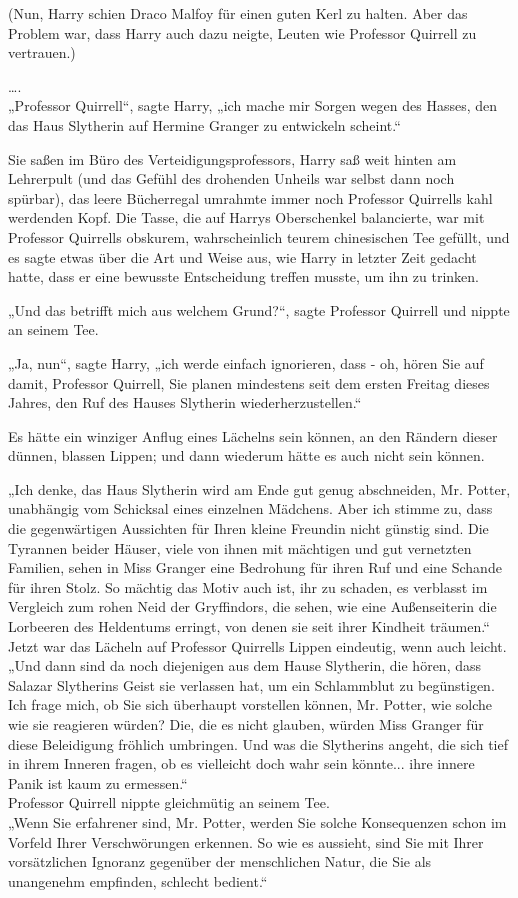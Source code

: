 {(Nun, Harry schien Draco Malfoy für einen guten Kerl zu halten. Aber das Problem war, dass Harry auch dazu neigte, Leuten wie Professor Quirrell zu vertrauen.)

….\\ „Professor Quirrell“, sagte Harry, „ich mache mir Sorgen wegen des Hasses, den das Haus Slytherin auf Hermine Granger zu entwickeln scheint.“

Sie saßen im Büro des Verteidigungsprofessors, Harry saß weit hinten am Lehrerpult (und das Gefühl des drohenden Unheils war selbst dann noch spürbar), das leere Bücherregal umrahmte immer noch Professor Quirrells kahl werdenden Kopf. Die Tasse, die auf Harrys Oberschenkel balancierte, war mit Professor Quirrells obskurem, wahrscheinlich teurem chinesischen Tee gefüllt, und es sagte etwas über die Art und Weise aus, wie Harry in letzter Zeit gedacht hatte, dass er eine bewusste Entscheidung treffen musste, um ihn zu trinken.

„Und das betrifft mich aus welchem Grund?“, sagte Professor Quirrell und nippte an seinem Tee.

„Ja, nun“, sagte Harry, „ich werde einfach ignorieren, dass - oh, hören Sie auf damit, Professor Quirrell, Sie planen mindestens seit dem ersten Freitag dieses Jahres, den Ruf des Hauses Slytherin wiederherzustellen.“

Es hätte ein winziger Anflug eines Lächelns sein können, an den Rändern dieser dünnen, blassen Lippen; und dann wiederum hätte es auch nicht sein können.

„Ich denke, das Haus Slytherin wird am Ende gut genug abschneiden, Mr. Potter, unabhängig vom Schicksal eines einzelnen Mädchens. Aber ich stimme zu, dass die gegenwärtigen Aussichten für Ihren kleine Freundin nicht günstig sind. Die Tyrannen beider Häuser, viele von ihnen mit mächtigen und gut vernetzten Familien, sehen in Miss Granger eine Bedrohung für ihren Ruf und eine Schande für ihren Stolz. So mächtig das Motiv auch ist, ihr zu schaden, es verblasst im Vergleich zum rohen Neid der Gryffindors, die sehen, wie eine Außenseiterin die Lorbeeren des Heldentums erringt, von denen sie seit ihrer Kindheit träumen.“\\ Jetzt war das Lächeln auf Professor Quirrells Lippen eindeutig, wenn auch leicht. „Und dann sind da noch diejenigen aus dem Hause Slytherin, die hören, dass Salazar Slytherins Geist sie verlassen hat, um ein Schlammblut zu begünstigen. Ich frage mich, ob Sie sich überhaupt vorstellen können, Mr. Potter, wie solche wie sie reagieren würden? Die, die es nicht glauben, würden Miss Granger für diese Beleidigung fröhlich umbringen. Und was die Slytherins angeht, die sich tief in ihrem Inneren fragen, ob es vielleicht doch wahr sein könnte... ihre innere Panik ist kaum zu ermessen.“\\ Professor Quirrell nippte gleichmütig an seinem Tee.\\ „Wenn Sie erfahrener sind, Mr. Potter, werden Sie solche Konsequenzen schon im Vorfeld Ihrer Verschwörungen erkennen. So wie es aussieht, sind Sie mit Ihrer vorsätzlichen Ignoranz gegenüber der menschlichen Natur, die Sie als unangenehm empfinden, schlecht bedient.“

}
